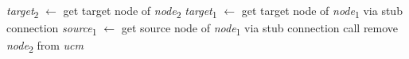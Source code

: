 \begin{algorithm}
\begin{algorithmic}[1]
		 \label{alg:2.13}
			\State \emph{target}\textsubscript{2} $\gets$ get target node of \emph{node}\textsubscript{2}
			\State \emph{target}\textsubscript{1} $\gets$ get target node of \emph{node}\textsubscript{1} via stub connection
			\State \emph{source}\textsubscript{1} $\gets$ get source node of \emph{node}\textsubscript{1} via stub connection
			\State call 
			\State remove \emph{node}\textsubscript{2} from \emph{ucm}
		\EndFunction \label{alg:2.14}
		
	\end{algorithmic}
\end{algorithm}

